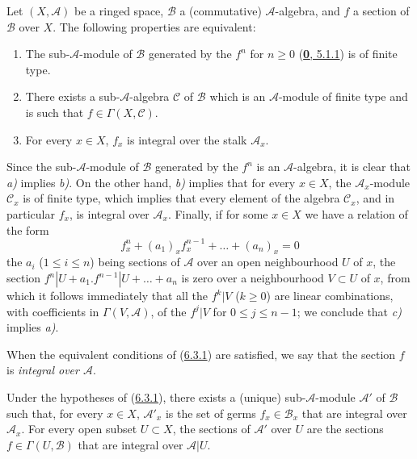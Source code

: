 \begin{proposition}[6.3.1]
\label{II.6.3.1}
Let $(X,\mathcal{A})$ be a ringed space, $\mathcal{B}$ a (commutative)
$\mathcal{A}$-algebra, and $f$ a section of $\mathcal{B}$ over $X$. The
following properties are equivalent:
\begin{enumerate}
\item[\textup{a)}] The sub-$\mathcal{A}$-module of $\mathcal{B}$ generated by the
$f^n$ for $n\geq 0$ \textup{(\hyperref[0.5.1.1]{\textbf{0}, 5.1.1})} is of finite type.
\item[\textup{b)}] There exists a sub-$\mathcal{A}$-algebra $\mathcal{C}$ of
$\mathcal{B}$ which is an $\mathcal{A}$-module of finite type and is such
that $f\in\Gamma(X,\mathcal{C})$.
\item[\textup{c)}] For every $x\in X$, $f_x$ is integral over the stalk
$\mathcal{A}_x$.
\end{enumerate}
\end{proposition}


Since the sub-$\mathcal{A}$-module of $\mathcal{B}$ generated by the $f^n$ is
an $\mathcal{A}$-algebra, it is clear that \emph{a)} implies \emph{b)}. On the other hand,
\emph{b)} implies that for every $x\in X$, the $\mathcal{A}_x$-module
$\mathcal{C}_x$ is of finite type, which implies that every element of the
algebra $\mathcal{C}_x$, and in particular $f_x$, is integral over
$\mathcal{A}_x$. Finally, if for some $x\in X$ we have a relation of the form
\[
f_x^n+(a_1)_xf_x^{n-1}+\ldots+(a_n)_x=0
\]
the $a_i$ ($1\leq i\leq n$) being sections of $\mathcal{A}$ over an open
neighbourhood $U$ of $x$, the section
$f^n|U+a_1.f^{n-1}|U+\ldots+a_n$ is zero over a neighbourhood
$V\subset U$ of $x$, from which it follows immediately that all the $f^k|V$
($k\geq0$) are linear combinations, with coefficients in
$\Gamma(V,\mathcal{A})$, of the $f^j|V$ for $0\leq j\leq n-1$; we conclude
that \emph{c)} implies \emph{a)}.

When the equivalent conditions of (\hyperref[II.6.3.1]{6.3.1}) are
satisfied, we say that the section $f$ is \emph{integral over
$\mathcal{A}$}.

\begin{corollary}[6.3.2]
\label{II.6.3.2}
Under the hypotheses of \textup{(\hyperref[II.6.3.1]{6.3.1})}, there exists a
(unique) sub-$\mathcal{A}$-module $\mathcal{A}'$ of $\mathcal{B}$ such that,
for every $x\in X$, $\mathcal{A}'_x$ is the set of germs
$f_x\in\mathcal{B}_x$ that are integral over $\mathcal{A}_x$. For every open
subset $U\subset X$, the sections of $\mathcal{A}'$ over $U$ are the sections
$f\in\Gamma(U,\mathcal{B})$ that are integral over
$\mathcal{A}|U$.
\end{corollary}

